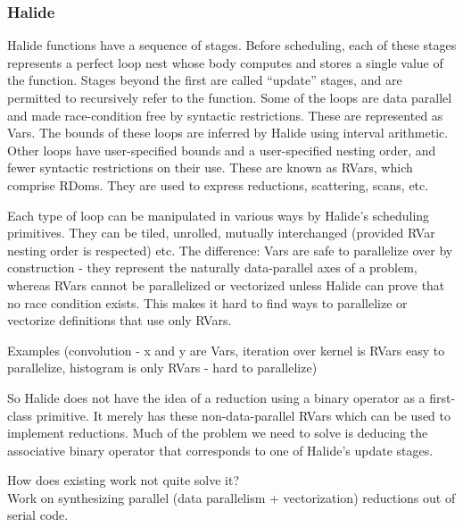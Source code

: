 \subsubsection{Halide}

Halide functions have a sequence of stages. Before scheduling, each of these stages represents a perfect loop nest whose body computes and stores a single value of the function. Stages beyond the first are called ``update'' stages, and are permitted to recursively refer to the function. Some of the loops are data parallel and made race-condition free by syntactic restrictions. These are represented as Vars. The bounds of these loops are inferred by Halide using interval arithmetic. Other loops have user-specified bounds and a user-specified nesting order, and fewer syntactic restrictions on their use. These are known as RVars, which comprise RDoms. They are used to express reductions, scattering, scans, etc.

Each type of loop can be manipulated in various ways by Halide's scheduling primitives. They can be tiled, unrolled, mutually interchanged (provided RVar nesting order is respected) etc. The difference: Vars are safe to parallelize over by construction - they represent the naturally data-parallel axes of a problem, whereas RVars cannot be parallelized or vectorized unless Halide can prove that no race condition exists. This makes it hard to find ways to parallelize or vectorize definitions that use only RVars.

Examples (convolution - x and y are Vars, iteration over kernel is RVars easy to parallelize, histogram is only RVars - hard to parallelize)

So Halide does not have the idea of a reduction using a binary operator as a first-class primitive. It merely has these non-data-parallel RVars which can be used to implement reductions. Much of the problem we need to solve is deducing the associative binary operator that corresponds to one of Halide's update stages.

How does existing work not quite solve it? \\

Work on synthesizing parallel (data parallelism + vectorization) reductions out of serial code. \\

